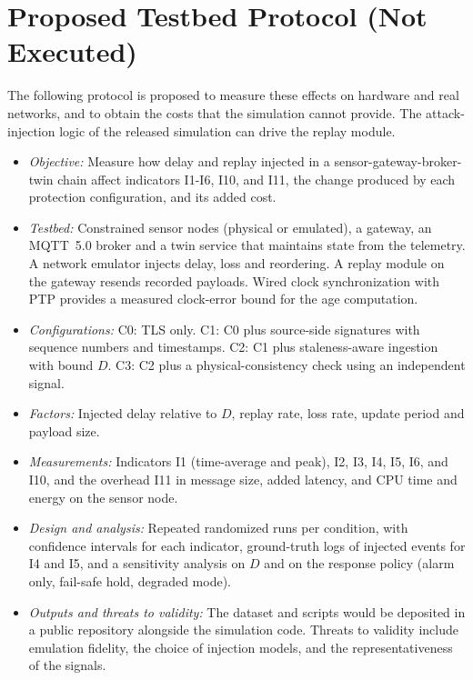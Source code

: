 \section{Proposed Testbed Protocol (Not Executed)}
The following protocol is proposed to measure these effects on hardware and real networks, and to obtain the costs that the simulation cannot provide. The attack-injection logic of the released simulation can drive the replay module.
\begin{itemize}
\item \emph{Objective:} Measure how delay and replay injected in a sensor-gateway-broker-twin chain affect indicators I1-I6, I10, and I11, the change produced by each protection configuration, and its added cost.
\item \emph{Testbed:} Constrained sensor nodes (physical or emulated), a gateway, an MQTT~5.0 broker and a twin service that maintains state from the telemetry. A network emulator injects delay, loss and reordering. A replay module on the gateway resends recorded payloads. Wired clock synchronization with PTP provides a measured clock-error bound for the age computation.
\item \emph{Configurations:} C0: TLS only. C1: C0 plus source-side signatures with sequence numbers and timestamps. C2: C1 plus staleness-aware ingestion with bound $D$. C3: C2 plus a physical-consistency check using an independent signal.
\item \emph{Factors:} Injected delay relative to $D$, replay rate, loss rate, update period and payload size.
\item \emph{Measurements:} Indicators I1 (time-average and peak), I2, I3, I4, I5, I6, and I10, and the overhead I11 in message size, added latency, and CPU time and energy on the sensor node.
\item \emph{Design and analysis:} Repeated randomized runs per condition, with confidence intervals for each indicator, ground-truth logs of injected events for I4 and I5, and a sensitivity analysis on $D$ and on the response policy (alarm only, fail-safe hold, degraded mode).
\item \emph{Outputs and threats to validity:} The dataset and scripts would be deposited in a public repository alongside the simulation code. Threats to validity include emulation fidelity, the choice of injection models, and the representativeness of the signals.
\end{itemize}
